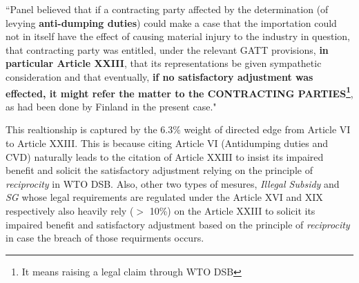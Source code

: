 \begin{displayquote}[]
    ``Panel believed that if a contracting party
    affected by the determination (of levying \textbf{anti-dumping duties}) could make a case that the importation could not in itself have the effect of
    causing material injury to the industry in question, that contracting party was entitled, under the relevant
    GATT provisions, \textbf{in particular Article XXIII}, that its representations be given sympathetic consideration
    and that eventually, \textbf{if no satisfactory adjustment was effected, it might refer the matter to the CONTRACTING
    PARTIES\footnote{It means raising a legal claim through WTO DSB}}, as had been done by Finland in the present case."
\end{displayquote}

\noindent This realtionship is captured by the $6.3\%$ weight of directed edge from Article VI to Article XXIII. This is because citing Article VI (Antidumping duties and CVD) naturally leads to the citation of Article XXIII to insist its impaired benefit and solicit the satisfactory adjustment relying on the principle of \textit{reciprocity} in WTO DSB. 
Also, other two types of mesures, \textit{Illegal Subsidy} and \textit{SG} whose legal requirements are regulated under the Article XVI and XIX respectively also heavily rely ($>$ 10\%) on the Article XXIII to solicit its impaired benefit and satisfactory adjustment based on the principle of \textit{reciprocity} in case the breach of those requirments occurs. 


